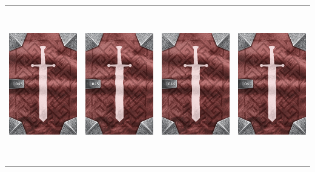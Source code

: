 \documentclass{minimal}
\begin{document}
{\begin{longtable}{llll}
\includegraphics[width=44mm,height=68mm]{./43-49/gh-045-pendant-of-dark-pacts-back.png} &
\includegraphics[width=44mm,height=68mm]{./43-49/gh-045-pendant-of-dark-pacts-back.png} &
\includegraphics[width=44mm,height=68mm]{./43-49/gh-044-splintmail-back.png} &
\includegraphics[width=44mm,height=68mm]{./43-49/gh-044-splintmail-back.png}\\ 

\end{longtable}}
\end{document}
